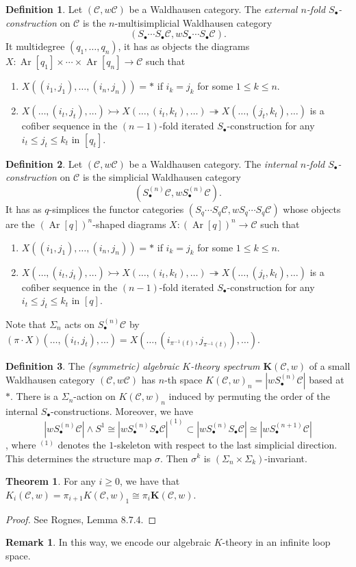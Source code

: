 \documentclass[10pt,letterpaper,cm]{nupset}
\theoremstyle{definition}
\newtheorem*{definition}{Definition}
\newtheorem{remark}{Remark}
\newtheorem{theorem}{Theorem}
\newcommand{\1}{\mathbf{1}}
\renewcommand{\c}{\mathscr{C}}
\newcommand{\0}{\vec 0}
\DeclareMathOperator{\Ar}{Ar}
\begin{document}
\begin{definition}
Let $(\c, w\c)$ be a Waldhausen category. The \textit{external $n$-fold $S_{\bullet}$-construction} on $\c$ is the $n$-multisimplicial Waldhausen category $$(S_{\bullet}\cdots S_{\bullet}\c, wS_{\bullet} \cdots S_{\bullet} \c).$$ It multidegree $(q_1, \ldots, q_n)$, it has as objects the diagrams  $X: \Ar[q_1] \times \cdots \times \Ar[q_n] \to \c$ such that
\begin{enumerate}
\item $X((i_1, j_1), \ldots, (i_n, j_n)) = \ast$ if $i_k = j_k$ for some $1\leq k \leq n$.
\item $X(\ldots, (i_t, j_t), \ldots) \rightarrowtail X(\ldots, (i_t, k_t), \ldots) \twoheadrightarrow X(\ldots, (j_t, k_t), \ldots)$ is a cofiber sequence  in the $(n-1)$-fold iterated $S_{\bullet}$-construction for any $i_t \leq j_t \leq k_t$ in $[q_t]$.
\end{enumerate}
\end{definition}

\begin{definition}
Let $(\c, w\c)$ be a Waldhausen category. The \textit{internal $n$-fold $S_{\bullet}$-construction} on $\c$ is the simplicial Waldhausen category $$(S_{\bullet}^{(n)}\c, wS_{\bullet}^{(n)} \c).$$ It has as $q$-simplices the functor categories $(S_q \cdots S_q \c, wS_q \cdots S_q \c)$ whose objects are the $(\Ar[q])^n$-shaped diagrams  $X: (\Ar[q])^n\to \c$ such that
\begin{enumerate}
\item $X((i_1, j_1), \ldots, (i_n, j_n)) = \ast$ if $i_k = j_k$ for some $1\leq k \leq n$.
\item $X(\ldots, (i_t, j_t), \ldots) \rightarrowtail X(\ldots, (i_t, k_t), \ldots) \twoheadrightarrow X(\ldots, (j_t, k_t), \ldots)$ is a cofiber sequence  in the $(n-1)$-fold iterated $S_{\bullet}$-construction for any $i_t \leq j_t \leq k_t$ in $[q]$.
\end{enumerate}
Note that $\Sigma_n$ acts on $S_{\bullet}^{(n)}\c$ by $(\pi \cdot X)(\ldots, (i_t, j_t), \ldots) = X(\ldots, (i_{\pi^{-1}(t)}, j_{\pi^{-1}(t)}), \ldots)$.
\end{definition}

\begin{definition}
The \textit{(symmetric) algebraic $K$-theory  spectrum $\mathbf{K}(\c, w)$} of a small Waldhausen category $(\c, w\c)$ has $n$-th space $K(\c, w)_n = |wS_{\bullet}^{(n)}\c|$ based at $\ast$. There is a $\Sigma_n$-action on $K(\c, w)_n$ induced by permuting the order of the internal $S_{\bullet}$-constructions. Moreover, we have $$|wS_{\bullet}^{(n)}\c| \land S^1 \cong |wS_{\bullet}^{(n)}S_{\bullet}\c|^{(1)} \subset |wS_{\bullet}^{(n)}S_{\bullet}\c| \cong |wS_{\bullet}^{(n+1)}\c|$$, where $^{(1)}$ denotes the $1$-skeleton with respect to the last simplicial direction. This determines the structure map $\sigma$. Then $\sigma^k$ is $(\Sigma_{n} \times \Sigma_{k})$-invariant.
\end{definition}


\begin{theorem}
For any $i\geq 0$, we have that $K_i(\c, w) = \pi_{i+1}K(\c, w)_1 \cong \pi_i \mathbf{K}(\c, w)$.
\end{theorem}
\begin{proof}
See Rognes, Lemma 8.7.4.
\end{proof}

\begin{remark}
In this way, we encode our algebraic $K$-theory in an infinite loop space.
\end{remark}
\end{document}
